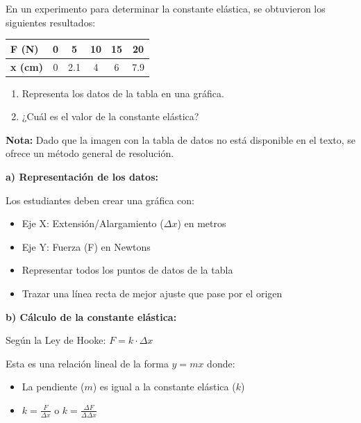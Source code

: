 \begin{exercise}
    En un experimento para determinar la constante elástica, se obtuvieron los siguientes resultados:
    \begin{table}[H]
        \centering
        \renewcommand{\arraystretch}{1.5}
        \begin{tabular}{Occccc}
            \bottomrule
            \textcolor{ocre}{\textbf{F (\unit{\newton})}}      & 0 & 5   & 10 & 15 & 20  \\
            \hline
            \textcolor{ocre}{\textbf{x (\unit{\centi\metre})}} & 0 & 2.1 & 4  & 6  & 7.9 \\
            \toprule
        \end{tabular}
        \label{tab:ejercicio1}
    \end{table}
    \begin{enumerate}[label=\alph*)]
        \item Representa los datos de la tabla en una gráfica.
        \item ¿Cuál es el valor de la constante elástica?
    \end{enumerate}

    \begin{solu}
        \textbf{Nota:} Dado que la imagen con la tabla de datos no está disponible en el texto, se ofrece un método general de resolución.

        \textbf{a) Representación de los datos:}

        Los estudiantes deben crear una gráfica con:
        \begin{itemize}
            \item Eje X: Extensión/Alargamiento ($\Delta x$) en metros
            \item Eje Y: Fuerza (F) en Newtons
            \item Representar todos los puntos de datos de la tabla
            \item Trazar una línea recta de mejor ajuste que pase por el origen
        \end{itemize}

        \textbf{b) Cálculo de la constante elástica:}

        Según la Ley de Hooke: $F = k \cdot \Delta x$

        Esta es una relación lineal de la forma $y = mx$ donde:
        \begin{itemize}
            \item La pendiente ($m$) es igual a la constante elástica ($k$)
            \item $k = \frac{F}{\Delta x}$ o $k = \frac{\Delta F}{\Delta \Delta x}$
        \end{itemize}


\end{solu}
\end{exercise}
